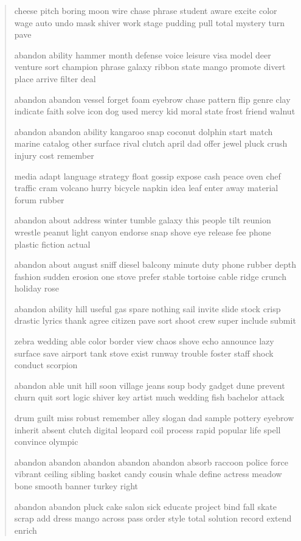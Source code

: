 \documentclass[a5paper, twoside]{book}
\begin{document}
\begin{verse}
 cheese pitch boring moon wire chase phrase student aware excite color wage auto undo mask shiver work stage pudding pull total mystery turn pave

 abandon ability hammer month defense voice leisure visa model deer venture sort champion phrase galaxy ribbon state mango promote divert place arrive filter deal

 abandon abandon vessel forget foam eyebrow chase pattern flip genre clay indicate faith solve icon dog used mercy kid moral state frost friend walnut

 abandon abandon ability kangaroo snap coconut dolphin start match marine catalog other surface rival clutch april dad offer jewel pluck crush injury cost remember

 media adapt language strategy float gossip expose cash peace oven chef traffic cram volcano hurry bicycle napkin idea leaf enter away material forum rubber

 abandon about address winter tumble galaxy this people tilt reunion wrestle peanut light canyon endorse snap shove eye release fee phone plastic fiction actual

 abandon about august sniff diesel balcony minute duty phone rubber depth fashion sudden erosion one stove prefer stable tortoise cable ridge crunch holiday rose

 abandon ability hill useful gas spare nothing sail invite slide stock crisp drastic lyrics thank agree citizen pave sort shoot crew super include submit

 zebra wedding able color border view chaos shove echo announce lazy surface save airport tank stove exist runway trouble foster staff shock conduct scorpion

 abandon able unit hill soon village jeans soup body gadget dune prevent churn quit sort logic shiver key artist much wedding fish bachelor attack

 drum guilt miss robust remember alley slogan dad sample pottery eyebrow inherit absent clutch digital leopard coil process rapid popular life spell convince olympic

 abandon abandon abandon abandon abandon absorb raccoon police force vibrant ceiling sibling basket candy cousin whale define actress meadow bone smooth banner turkey right

 abandon abandon pluck cake salon sick educate project bind fall skate scrap add dress mango across pass order style total solution record extend enrich


\end{verse}
\end{document}
